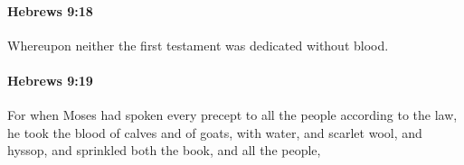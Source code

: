 		\paragraph{Hebrews 9:18} %
			\label{HEBREWS-9-18}

			Whereupon neither the first testament was dedicated without blood.

			\begin{framed}
			\scriptsize
				\begin{compactdesc}
					\item[SBLG] 
				\end{compactdesc}
			\end{framed}

		\paragraph{Hebrews 9:19} %
			\label{HEBREWS-9-19}

			For when Moses had spoken every precept to all the people according to the law, he took the blood of calves and of goats, with water, and scarlet wool, and hyssop, and sprinkled both the book, and all the people,

